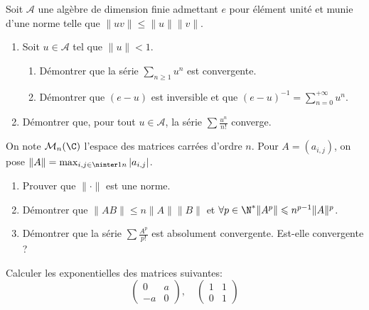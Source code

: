 \begin{exercice}
    Soit $\mathcal{A}$ une algèbre de dimension finie admettant $e$ pour élément unité et munie d'une norme telle que $\|uv\| \leqslant \|u\|\|v\|$.
    \begin{enumerate}
        \item Soit $u \in \mathcal{A}$ tel que $\|u\| < 1$.
        \begin{enumerate}
            \item Démontrer que la série $\sum_{n\geqslant1} u^{n}$ est convergente.
            \item Démontrer que $(e-u)$ est inversible et que $\displaystyle (e-u)^{-1}=\sum_{n=0}^{+\infty}u^{n}$.
        \end{enumerate}
        \item Démontrer que, pour tout $u \in \mathcal{A}$, la série $\sum\frac{u^{n}}{n!}$ converge.
    \end{enumerate}
\end{exercice}

\begin{exercice}
    On note $\mathcal{M}_{n}(\C)$ l'espace des matrices carrées d'ordre $n$. Pour $A=(a_{i,j})$, on pose $\|A\| = \max_{i,j \in \ninter 1 n} |a_{i,j}|$.
    \begin{enumerate}
        \item Prouver que $\|\cdot\|$ est une norme.
        \item Démontrer que $\|AB\| \leqslant n\|A\|\|B\|$ et $\forall p \in \N^* \|A^p\| \leqslant n^{p-1}\|A\|^p$.
        \item Démontrer que la série $\sum\frac{A^{p}}{p!}$ est absolument convergente. Est-elle convergente ?
    \end{enumerate}
\end{exercice}

\begin{exercice}
    Calculer les exponentielles des matrices suivantes:
    \[\begin{pmatrix} 0 & a \\ -a & 0 \end{pmatrix}, \quad \begin{pmatrix} 1 & 1 \\ 0 & 1 \end{pmatrix}\]

\end{exercice}

